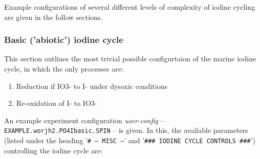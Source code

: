\documentclass[11pt,fleqn]{book} %
\begin{document}
Example configurations of several different levels of complexity of iodine cycling are given in the follow sections. 

%
\subsubsection{Basic ('abiotic') iodine cycle}
\vspace{1mm}

This section outlines the most trivial possible configurtaion of the marine iodine cycle, in which the only processes are:
\begin{enumerate}[noitemsep]
\vspace{1mm}
\item Reduction if IO3- to I- under dysoxic conditions
\vspace{1mm}
\item Re-oxidation of I- to IO3-
\end{enumerate}
\vspace{1mm}

\noindent An example experiment configuration \textit{user-config} -- \texttt{EXAMPLE.worjh2.PO4Ibasic.SPIN} -- is given. In this, the available parameters (listed under the heading '\texttt{\# --- MISC ---}' and '\texttt{\#\#\# IODINE CYCLE CONTROLS \#\#\#}') controlling the iodine cycle are:
\end{document}
